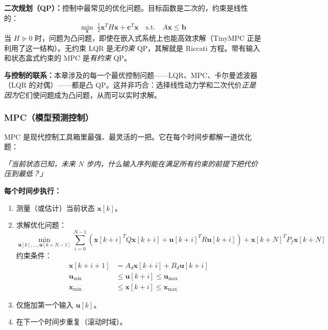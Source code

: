 \textbf{二次规划（QP）：}控制中最常见的优化问题。目标函数是二次的，约束是线性的：
\[
\min_{\mathbf{x}} \; \tfrac{1}{2}\mathbf{x}^T H \mathbf{x} + \mathbf{c}^T \mathbf{x} \quad \text{s.t.} \quad A\mathbf{x} \leq \mathbf{b}
\]
当 $H \succeq 0$ 时，问题为凸问题，即使在嵌入式系统上也能高效求解（TinyMPC 正是利用了这一结构）。无约束 LQR 是\textit{无约束} QP，其解就是 Riccati 方程。带有输入和状态盒式约束的 MPC 是\textit{有约束} QP。

\textbf{与控制的联系：}本章涉及的每一个最优控制问题——LQR、MPC、卡尔曼滤波器（LQR 的对偶）——都是凸 QP。这并非巧合：选择线性动力学和二次代价\textit{正是因为}它们使问题成为凸问题，从而可以实时求解。

\subsubsection{MPC（模型预测控制）}

MPC 是现代控制工具箱里最强、最灵活的一把。它在每个时间步都解一道优化题：

\textit{「当前状态已知，未来 $N$ 步内，什么输入序列能在满足所有约束的前提下把代价压到最低？」}

\textbf{每个时间步执行：}
\begin{enumerate}
    \item 测量（或估计）当前状态 $\mathbf{x}[k]$。
    \item 求解优化问题：
    \begin{equation}
    \min_{\mathbf{u}[k], \ldots, \mathbf{u}[k+N-1]} \sum_{i=0}^{N-1} \left( \mathbf{x}[k+i]^T Q \mathbf{x}[k+i] + \mathbf{u}[k+i]^T R \mathbf{u}[k+i] \right) + \mathbf{x}[k+N]^T P_f \mathbf{x}[k+N]
    \end{equation}
    约束条件：
    \begin{align}
    \mathbf{x}[k+i+1] &= A_d \mathbf{x}[k+i] + B_d \mathbf{u}[k+i] \\
    \mathbf{u}_{\min} &\leq \mathbf{u}[k+i] \leq \mathbf{u}_{\max} \\
    \mathbf{x}_{\min} &\leq \mathbf{x}[k+i] \leq \mathbf{x}_{\max}
    \end{align}
    \item 仅施加第一个输入 $\mathbf{u}[k]$。
    \item 在下一个时间步重复（滚动时域）。
\end{enumerate}

